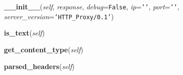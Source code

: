     \vspace{0.5ex}

\hspace{.8\funcindent}\begin{boxedminipage}{\funcwidth}

    \raggedright \textbf{\_\_init\_\_}(\textit{self}, \textit{response}, \textit{debug}={\tt False}, \textit{ip}={\tt \texttt{'}\texttt{}\texttt{'}}, \textit{port}={\tt \texttt{'}\texttt{}\texttt{'}}, \textit{server\_version}={\tt \texttt{'}\texttt{HTTP\_Proxy/0.1}\texttt{'}})

\setlength{\parskip}{2ex}
\setlength{\parskip}{1ex}
    \end{boxedminipage}

    \label{Headers:ServerHeaders:is_text}

    \vspace{0.5ex}

\hspace{.8\funcindent}\begin{boxedminipage}{\funcwidth}

    \raggedright \textbf{is\_text}(\textit{self})

\setlength{\parskip}{2ex}
\setlength{\parskip}{1ex}
    \end{boxedminipage}

    \label{Headers:ServerHeaders:get_content_type}

    \vspace{0.5ex}

\hspace{.8\funcindent}\begin{boxedminipage}{\funcwidth}

    \raggedright \textbf{get\_content\_type}(\textit{self})

\setlength{\parskip}{2ex}
\setlength{\parskip}{1ex}
    \end{boxedminipage}

    \label{Headers:ServerHeaders:parsed_headers}

    \vspace{0.5ex}

\hspace{.8\funcindent}\begin{boxedminipage}{\funcwidth}

    \raggedright \textbf{parsed\_headers}(\textit{self})

\setlength{\parskip}{2ex}
\setlength{\parskip}{1ex}
    \end{boxedminipage}

